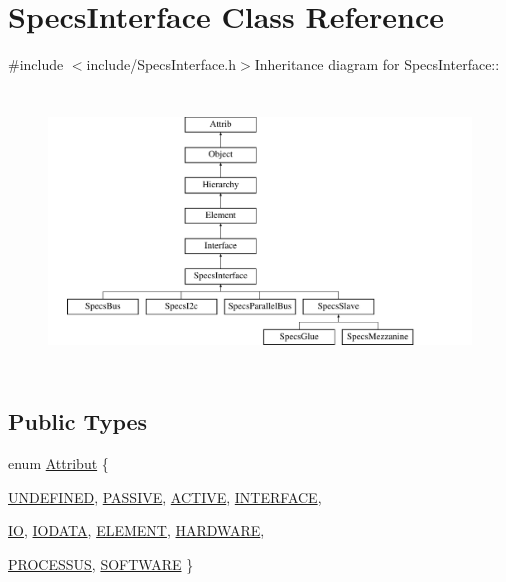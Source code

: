 \hypertarget{classSpecsInterface}{
\section{SpecsInterface Class Reference}
\label{classSpecsInterface}
}


{\ttfamily \#include $<$include/SpecsInterface.h$>$}Inheritance diagram for SpecsInterface::\begin{figure}[H]
\begin{center}
\leavevmode
\includegraphics[height=7.52941cm]{classSpecsInterface}
\end{center}
\end{figure}
\subsection*{Public Types}
\begin{DoxyCompactItemize}
\item 
enum \hyperlink{classAttrib_a69e171d7cc6417835a5a306d3c764235}{Attribut} \{ \par
\hyperlink{classAttrib_a69e171d7cc6417835a5a306d3c764235a3a8da2ab97dda18aebab196fe4100531}{UNDEFINED}, 
\hyperlink{classAttrib_a69e171d7cc6417835a5a306d3c764235a2bfb2af57b87031d190a05fe25dd92ed}{PASSIVE}, 
\hyperlink{classAttrib_a69e171d7cc6417835a5a306d3c764235a3b1fec929c0370d1436f2f06e298fb0d}{ACTIVE}, 
\hyperlink{classAttrib_a69e171d7cc6417835a5a306d3c764235aa27c16b480a369ea4d18b07b2516bbc7}{INTERFACE}, 
\par
\hyperlink{classAttrib_a69e171d7cc6417835a5a306d3c764235a1420a5b8c0540b2af210b6975eded7f9}{IO}, 
\hyperlink{classAttrib_a69e171d7cc6417835a5a306d3c764235a0af3b0d0ac323c1704e6c69cf90add28}{IODATA}, 
\hyperlink{classAttrib_a69e171d7cc6417835a5a306d3c764235a7788bc5dd333fd8ce18562b269c9dab1}{ELEMENT}, 
\hyperlink{classAttrib_a69e171d7cc6417835a5a306d3c764235a61ceb22149f365f1780d18f9d1459423}{HARDWARE}, 
\par
\hyperlink{classAttrib_a69e171d7cc6417835a5a306d3c764235a75250e29692496e73effca2c0330977f}{PROCESSUS}, 
\hyperlink{classAttrib_a69e171d7cc6417835a5a306d3c764235a103a67cd0b8f07ef478fa45d4356e27b}{SOFTWARE}
 \}
\end{DoxyCompactItemize}
